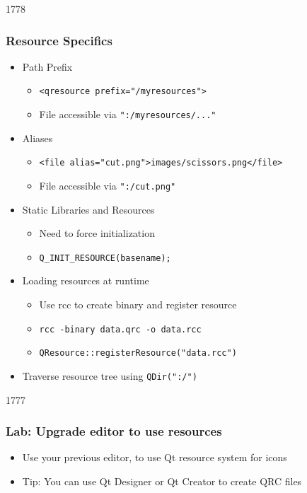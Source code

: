 \begin{slide}{1778}\frametitle{Resource Specifics}
  \begin{itemize}
  \item Path Prefix
    \begin{itemize}
    \item \texttt{<qresource prefix="/myresources">}
    \item File accessible via \texttt{":/myresources/..."}
    \end{itemize}
  \item Aliases
    \begin{itemize}
    \item \texttt{<file alias="cut.png">images/scissors.png</file>}
    \item File accessible via \texttt{":/cut.png"}
    \end{itemize}
  \item Static Libraries and Resources
    \begin{itemize}
    \item Need to force initialization
    \item \texttt{Q\_INIT\_RESOURCE(basename);}
    \end{itemize}
  \item Loading resources at runtime
    \begin{itemize}
    \item Use rcc to create binary and register resource
    \item \texttt{rcc -binary data.qrc -o data.rcc}
    \item \texttt{QResource::registerResource("data.rcc")}
    \end{itemize}
  \item Traverse resource tree using \texttt{QDir(":/")}
  \end{itemize}
\end{slide}


\begin{slide}{1777}
  \frametitle{Lab: Upgrade editor to use resources}
  \begin{itemize}
  \item Use your previous editor, to use Qt resource system for icons
  \item Tip: You can use Qt Designer or Qt Creator to create QRC files
  \end{itemize}
\end{slide}

